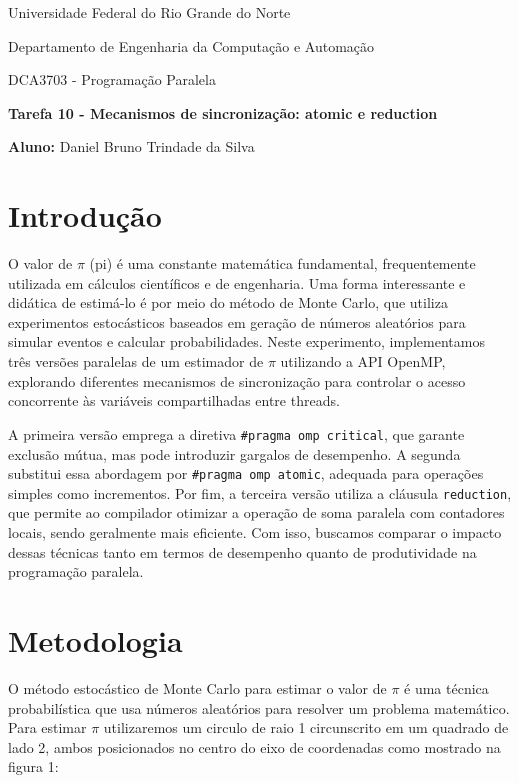 \documentclass[a4paper, 12pt]{article}
\begin{document}
	\begin{center}
		Universidade Federal do Rio Grande do Norte
		
		Departamento de Engenharia da Computação e Automação
		
		DCA3703 - Programação Paralela
		
		\textbf{Tarefa 10 - Mecanismos de sincronização: atomic e reduction}
		
		\textbf{Aluno:} Daniel Bruno Trindade da Silva
	\end{center}
	
	\section{Introdução}
	\hspace{0.7cm}O valor de $\pi$ (pi) é uma constante matemática fundamental, frequentemente utilizada em cálculos científicos e de engenharia. Uma forma interessante e didática de estimá-lo é por meio do método de Monte Carlo, que utiliza experimentos estocásticos baseados em geração de números aleatórios para simular eventos e calcular probabilidades. Neste experimento, implementamos três versões paralelas de um estimador de $\pi$ utilizando a API OpenMP, explorando diferentes mecanismos de sincronização para controlar o acesso concorrente às variáveis compartilhadas entre threads.
	
	A primeira versão emprega a diretiva \texttt{\#pragma omp critical}, que garante exclusão mútua, mas pode introduzir gargalos de desempenho. A segunda substitui essa abordagem por \texttt{\#pragma omp atomic}, adequada para operações simples como incrementos. Por fim, a terceira versão utiliza a cláusula \texttt{reduction}, que permite ao compilador otimizar a operação de soma paralela com contadores locais, sendo geralmente mais eficiente. Com isso, buscamos comparar o impacto dessas técnicas tanto em termos de desempenho quanto de produtividade na programação paralela.
	
	\section{Metodologia}
		\hspace{.7cm}O método estocástico de Monte Carlo para estimar o valor de $\pi$ é uma técnica probabilística que usa números aleatórios para resolver um problema matemático. Para estimar $\pi$ utilizaremos um circulo de raio 1 circunscrito em um quadrado de lado 2, ambos posicionados no centro do eixo de coordenadas como mostrado na figura 1: 
	
\end{document}
